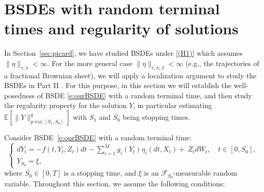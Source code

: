\documentclass[11pt,reqno]{amsart}
\numberwithin{equation}{section}
\begin{document}
\section{BSDEs with random terminal times and  regularity of solutions}\label{sec:continuity map}

In Section~\ref{sec:picard}, we have studied BSDEs under \ref{(H1)} which assumes $\|\eta\|_{\tau,\lambda}<\infty$. For the more general case $\|\eta\|_{\tau,\lambda;\beta}<\infty$ (e.g., the trajectories of a fractional Brownian sheet), we will apply a localization argument to study the BSDEs in Part II \cite{BSDEYoung-II}. For this purpose, in this section we will establish the well-posedness of BSDE \eqref{e:ourBSDE} with  a random terminal time, and then study the regularity property for the solution $Y$, in particular estimating $\mathbb{E}[\|Y\|^{q}_{p\text{-var};[S_{1},S_{0}]}]$ with $S_1$ and $S_0$ being stopping times. 

Consider BSDE~\eqref{e:ourBSDE} with a random terminal time:
\begin{equation}\label{e:BSDE'}
\begin{cases}
dY_{t} = - f(t,Y_{t},Z_{t})dt  - \sum\limits_{i=1}^{M}g_{i}(Y_{t})\eta_{i}(dt,X_{t}) + \ Z_{t}dW_{t},\quad  t\in[0,S_{0}],\\
 Y_{S_{0}}=\xi,
\end{cases}	
\end{equation}
where $S_0\in[0,T]$ is a stopping time, and $\xi$ is an $\mathcal F_{S_0}$-measurable random variable.
Throughout this section, we assume the following conditions:
\end{document}

